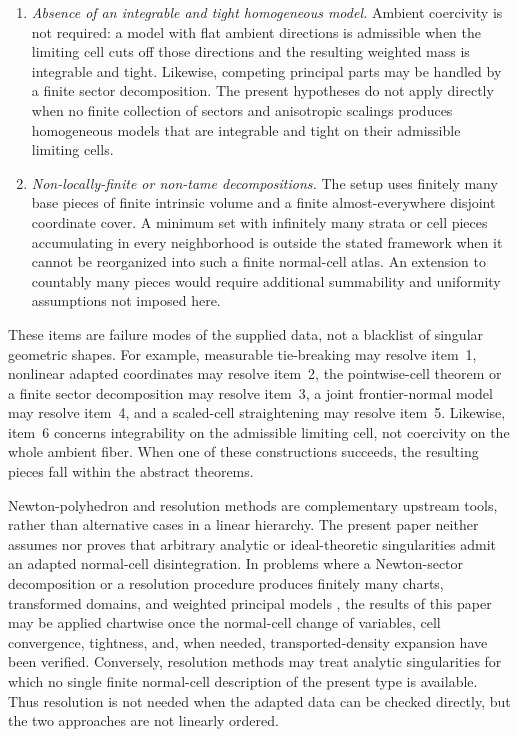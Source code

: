 \documentclass[11pt]{amsart}
\numberwithin{equation}{section}
\theoremstyle{definition}
\theoremstyle{remark}
\begin{document}
\begin{enumerate}[leftmargin=2.3em]
\item \emph{Absence of an integrable and tight homogeneous model.}
Ambient coercivity is not required: a model with flat ambient directions is
admissible when the limiting cell cuts off those directions and the resulting
weighted mass is integrable and tight.  Likewise, competing principal parts may
be handled by a finite sector decomposition.  The present hypotheses do not
apply directly when no finite collection of sectors and anisotropic scalings
produces homogeneous models that are integrable and tight on their admissible
limiting cells.

\item \emph{Non-locally-finite or non-tame decompositions.}
The setup uses finitely many base pieces of finite intrinsic volume and a finite
almost-everywhere disjoint coordinate cover.  A minimum set with infinitely
many strata or cell pieces accumulating in every neighborhood is outside the
stated framework when it cannot be reorganized into such a finite
normal-cell atlas.  An extension to countably many pieces would require
additional summability and uniformity assumptions not imposed here.

\end{enumerate}

These items are failure modes of the supplied data, not a blacklist of
singular geometric shapes.  For example, measurable tie-breaking may resolve
item~1, nonlinear adapted coordinates may resolve item~2, the pointwise-cell
theorem or a finite sector decomposition may resolve item~3, a joint
frontier-normal model may resolve item~4, and a scaled-cell straightening may
resolve item~5.  Likewise, item~6 concerns integrability on the admissible
limiting cell, not coercivity on the whole ambient fiber.  When one of these
constructions succeeds, the resulting pieces fall within the abstract
theorems.

Newton-polyhedron and resolution methods are complementary upstream tools,
rather than alternative cases in a linear hierarchy.  The present paper
neither assumes nor proves that arbitrary analytic or ideal-theoretic
singularities admit an adapted normal-cell disintegration.  In problems where a
Newton-sector decomposition or a resolution procedure produces finitely many
charts, transformed domains, and weighted principal models
\cite{WatanabeAGSLT,LinRLCT}, the results of this paper may be applied
chartwise once the normal-cell change of variables, cell convergence,
tightness, and, when needed, transported-density expansion have been verified.
Conversely, resolution methods may treat analytic singularities for which no
single finite normal-cell description of the present type is available.
Thus resolution is not needed when the adapted data can be checked directly,
but the two approaches are not linearly ordered.
\end{document}
